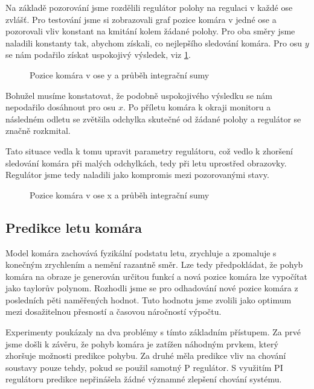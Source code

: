 \documentclass[a4paper,10pt]{article}
\begin{document}
Na základě pozorování jsme rozdělili regulátor polohy na regulaci v každé ose zvlášť.
Pro testování jsme si zobrazovali graf pozice komára v jedné ose a pozorovali vliv konstant na kmitání kolem žádané polohy. 
Pro oba směry jsme naladili konstanty tak, abychom získali, co nejlepšího sledování komára.
Pro osu $y$ se nám podařilo získat uspokojivý výsledek, viz \ref{fig:osay}. 

\begin{figure}[!h]
	\centering
	\caption{Pozice komára v ose y a průběh integrační sumy}\label{fig:osay}
\end{figure}

Bohužel musíme konstatovat, že podobně uspokojivého výsledku se nám nepodařilo dosáhnout pro osu $x$. 
Po příletu komára k okraji monitoru a následném odletu se zvětšila odchylka skutečné od žádané polohy 
a regulátor se značně rozkmital. 

Tato situace vedla k tomu upravit parametry regulátoru, což vedlo k zhoršení sledování komára při malých odchylkách, 
tedy při letu uprostřed obrazovky. Regulátor jsme tedy naladili jako kompromis mezi pozorovanými stavy. 

\begin{figure}[!h]
	\centering
	\caption{Pozice komára v ose x a průběh integrační sumy}\label{fig:osax}
\end{figure}

\subsection{Predikce letu komára}

Model komára zachovává fyzikální podstatu letu, zrychluje a zpomaluje s koneč\-ným zrychlením a nemění razantně směr.
Lze tedy předpokládat, že pohyb komára na obraze je generován určitou funkcí a 
nová pozice komára lze vypočítat jako taylorův polynom. 
Rozhodli jsme se pro odhadování nové pozice komára z posledních pěti naměřených hodnot.
Tuto hodnotu jsme zvolili jako optimum mezi dosažitelnou přesností a časovou náročností výpočtu.

Experimenty poukázaly na dva problémy s tímto základním přístupem. 
Za prvé jsme došli k závěru, že pohyb komára je zatížen náhodným prvkem, který zhoršuje možnosti predikce pohybu.
Za druhé měla predikce vliv na chování soustavy pouze tehdy, pokud se použil samotný P regulátor. 
S využitím PI regulátoru predikce nepřinášela žádné významné zlepšení chování systému.
\end{document}

